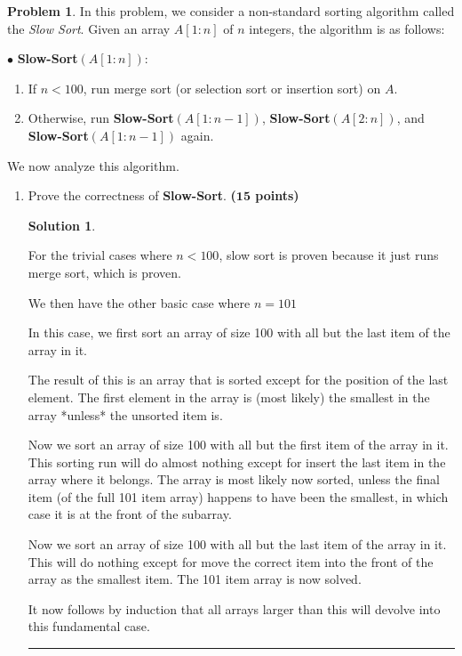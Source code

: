 \documentclass{article}
\theoremstyle{definition}
\newtheorem{problem}{Problem}
\def\fline{\rule{0.75\linewidth}{0.5pt}}
\newcommand{\finishline}{
  \begin{center}\fline
\end{center}}
\newtheorem*{solution*}{Solution}
\newenvironment{solution}{
\begin{solution*}}{{\finishline}
\end{solution*}}
\newcommand{\grade}[1]{\hfill{\textbf{($\mathbf{#1}$ points)}}}
\begin{document}
  \begin{problem}
    In this problem, we consider a non-standard sorting algorithm called the \emph{Slow Sort}. Given an array $A[1:n]$ of $n$ integers, the algorithm is as follows:

    $\bullet$ \textbf{Slow-Sort}$(A[1:n])$:
    \begin{enumerate}
      \item If $n < 100$, run merge sort (or selection sort or insertion sort) on $A$.
      \item Otherwise, run \textbf{Slow-Sort}$(A[1:n-1])$, \textbf{Slow-Sort}$(A[2:n])$, and \textbf{Slow-Sort}$(A[1:n-1])$ again.
    \end{enumerate}

    We now analyze this algorithm.

    \begin{enumerate}
      \item [(a)] Prove the correctness of  \textbf{Slow-Sort}. \grade{15}

        \begin{solution}
          \

          For the trivial cases where $n<100$, slow sort is proven because it just runs merge sort, which is proven.

          We then have the other basic case where $n = 101$

          In this case, we first sort an array of size 100 with all but the last item of the array in it.

          The result of this is an array that is sorted except for the position of the last element. The first element in the array is (most likely) the smallest in the array *unless* the unsorted item is.

          Now we sort an array of size 100 with all but the first item of the array in it. This sorting run will do almost nothing except for insert the last item in the array where it belongs. The array is most likely now sorted, unless the final item (of the full 101 item array) happens to have been the smallest, in which case it is at the front of the subarray.

          Now we sort an array of size 100 with all but the last item of the array in it. This will do nothing except for move the correct item into the front of the array as the smallest item. The 101 item array is now solved.

          It now follows by induction that all arrays larger than this will devolve into this fundamental case.
        \end{solution}


\end{enumerate}
\end{problem}
\end{document}
